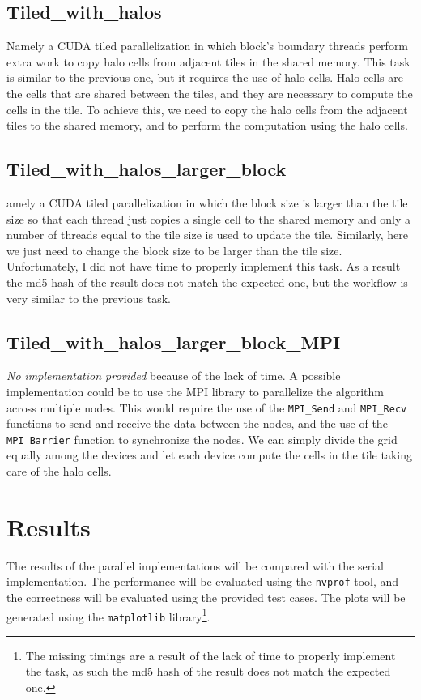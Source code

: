 \documentclass{article}
\begin{document}
\subsection{Tiled\_with\_halos}
Namely a CUDA tiled parallelization in which block’s boundary threads perform extra work to copy halo cells from adjacent tiles in the shared memory.
This task is similar to the previous one, but it requires the use of halo cells. Halo cells are the cells that are shared between the tiles, and they are necessary to compute the cells in the tile. To achieve this, we need to copy the halo cells from the adjacent tiles to the shared memory, and to perform the computation using the halo cells.

\subsection{Tiled\_with\_halos\_larger\_block}
amely a CUDA tiled parallelization in which the block size is larger than the tile size so that each thread just copies a single cell to the shared memory and only a number of threads equal to the tile size is used to update the tile.
Similarly, here we just need to change the block size to be larger than the tile size. Unfortunately, I did not have time to properly implement this task. As a result the md5 hash of the result does not match the expected one, but the workflow is very similar to the previous task.

\subsection{Tiled\_with\_halos\_larger\_block\_MPI}
\textit{No implementation provided} because of the lack of time.
A possible implementation could be to use the MPI library to parallelize the algorithm across multiple nodes. This would require the use of the \texttt{MPI\_Send} and \texttt{MPI\_Recv} functions to send and receive the data between the nodes, and the use of the \texttt{MPI\_Barrier} function to synchronize the nodes. We can simply divide the grid equally among the devices and let each device compute the cells in the tile taking care of the halo cells.

\newpage

\section{Results}
The results of the parallel implementations will be compared with the serial implementation. The performance will be evaluated using the \texttt{nvprof} tool, and the correctness will be evaluated using the provided test cases. The plots will be generated using the \texttt{matplotlib} library\footnote{The missing timings are a result of the lack of time to properly implement the task, as such the md5 hash of the result does not match the expected one.}.
\end{document}
